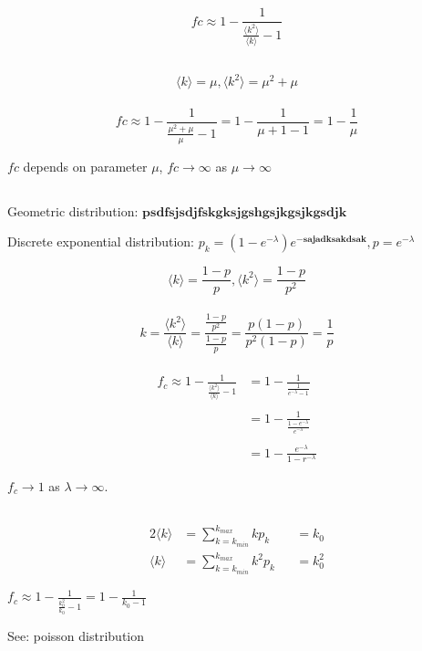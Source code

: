 \documentclass[../document.tex]{subfiles}
\begin{document}
\section{}

$$ fc \approx 1 - \frac{ 1 }{ \frac{ \langle k^2 \rangle }{ \langle k \rangle } - 1 } $$

\subsection{}

$$ \langle k \rangle = \mu, \langle k^2 \rangle = \mu^2 + \mu $$ \\

$$ fc \approx 1 - \frac{ 1 }{ \frac{ \mu^2 + \mu }{ \mu } - 1 } = 1 - \frac{ 1 }{ \mu + 1 - 1} = 1 - \frac{ 1 }{ \mu } $$

$ fc $ depends on parameter $ \mu $, $ fc \to \infty $ as $ \mu \to \infty $

\subsection{}

Geometric distribution: $ \mathbf{psdfsjsdjfskgksjgshgsjkgsjkgsdjk} $

Discrete exponential distribution: $ p_k = (1 - e^{ -\lambda }) e^{ \mathbf{-sajadksakdsak} }, p = e^{ -\lambda } $

$$ \langle k \rangle = \frac{ 1-p }{ p }, \langle k^2 \rangle = \frac{ 1-p }{ p^2 } $$ \\

$$ k = \frac{ \langle k^2 \rangle }{ \langle k \rangle } = \frac{ \frac{ 1-p }{ p^2 } }{ \frac{ 1-p }{ p } } = \frac{ p(1-p) }{ p^2(1-p) } = \frac{1}{p} $$ \\

\begin{align*}
f_c \approx 1 - \frac{ 1 }{ \frac{ \langle k^2 \rangle }{ \langle k \rangle } - 1 } &= 1 - \frac{1}{ \frac{ 1 }{ e^{ -\lambda } - 1} } \\ \\
&= 1 - \frac{ 1 }{ \frac{ 1 - e^{ -\lambda } }{ e^{ -\lambda } } } \\ \\
&= 1 - \frac{ e^{ -\lambda } }{ 1 - r^{ -\lambda } }
\end{align*}

$ f_c \to 1 $ as $ \lambda \to \infty $.

\subsection{}

\begin{alignat*}{2}
\langle k \rangle &= \sum\limits^{k_{max}}_{k=k_{min}} k p_k   &&= k_0 \\
\langle k \rangle &= \sum\limits^{k_{max}}_{k=k_{min}} k^2 p_k &&= k_0^2
\end{alignat*}

$ f_c \approx 1 - \frac{ 1 }{ \frac{ k^2_0 }{ k_0 } - 1 } = 1 - \frac{ 1 }{ k_0 - 1 } $

See: poisson distribution
\end{document}
